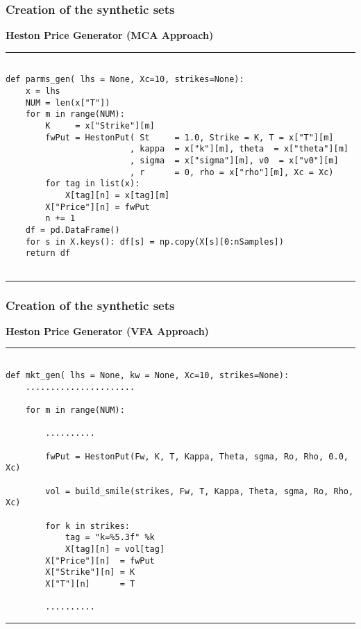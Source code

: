 \documentclass[11pt]{beamer}
\begin{document}
\begin{frame}[fragile]
\frametitle{Creation of the synthetic sets}
\textbf{Heston Price Generator (MCA Approach)}
\rule{\textwidth}{1pt}
\scriptsize
\begin{verbatim}

def parms_gen( lhs = None, Xc=10, strikes=None):
    x = lhs
    NUM = len(x["T"])
    for m in range(NUM):
        K     = x["Strike"][m]
        fwPut = HestonPut( St     = 1.0, Strike = K, T = x["T"][m]
                         , kappa  = x["k"][m], theta  = x["theta"][m]
                         , sigma  = x["sigma"][m], v0  = x["v0"][m]
                         , r      = 0, rho = x["rho"][m], Xc = Xc)
        for tag in list(x):
            X[tag][n] = x[tag][m]
        X["Price"][n] = fwPut
        n += 1
    df = pd.DataFrame()
    for s in X.keys(): df[s] = np.copy(X[s][0:nSamples])
    return df


\end{verbatim}
\rule{\textwidth}{1pt}
\end{frame}
\begin{frame}[fragile]
\frametitle{Creation of the synthetic sets}
\textbf{Heston Price Generator (VFA Approach)}
\rule{\textwidth}{1pt}
\scriptsize
\begin{verbatim}

def mkt_gen( lhs = None, kw = None, Xc=10, strikes=None):
	......................
    
    for m in range(NUM):
		
		..........	 
 
        fwPut = HestonPut(Fw, K, T, Kappa, Theta, sgma, Ro, Rho, 0.0, Xc)

        vol = build_smile(strikes, Fw, T, Kappa, Theta, sgma, Ro, Rho, Xc)

        for k in strikes:
            tag = "k=%5.3f" %k
            X[tag][n] = vol[tag]
        X["Price"][n]  = fwPut
        X["Strike"][n] = K
        X["T"][n]      = T

		..........

\end{verbatim}
\rule{\textwidth}{1pt}
\end{frame}
\end{document}
